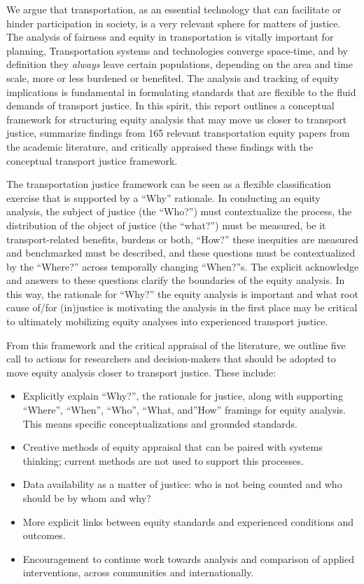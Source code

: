 \documentclass[12pt, oneside]{report}
\providecommand{\tightlist}{%
  \setlength{\itemsep}{0pt}\setlength{\parskip}{0pt}}\usepackage{longtable,booktabs,array}
\begin{document}
We argue that transportation, as an essential technology that can
facilitate or hinder participation in society, is a very relevant sphere
for matters of justice. The analysis of fairness and equity in
transportation is vitally important for planning, Transportation systems
and technologies converge space-time, and by definition they
\emph{always} leave certain populations, depending on the area and time
scale, more or less burdened or benefited. The analysis and tracking of
equity implications is fundamental in formulating standards that are
flexible to the fluid demands of transport justice. In this spirit, this
report outlines a conceptual framework for structuring equity analysis
that may move us closer to transport justice, summarize findings from
165 relevant transportation equity papers from the academic literature,
and critically appraised these findings with the conceptual transport
justice framework.

The transportation justice framework can be seen as a flexible
classification exercise that is supported by a ``Why'' rationale. In
conducting an equity analysis, the subject of justice (the ``Who?'')
must contextualize the process, the distribution of the object of
justice (the ``what?'') must be measured, be it transport-related
benefits, burdens or both, ``How?'' these inequities are measured and
benchmarked must be described, and these questions must be
contextualized by the ``Where?'' across temporally changing ``When?''s.
The explicit acknowledge and answers to these questions clarify the
boundaries of the equity analysis. In this way, the rationale for
``Why?'' the equity analysis is important and what root cause of/for
(in)justice is motivating the analysis in the first place may be
critical to ultimately mobilizing equity analyses into experienced
transport justice.

From this framework and the critical appraisal of the literature, we
outline five call to actions for researchers and decision-makers that
should be adopted to move equity analysis closer to transport justice.
These include:

\begin{itemize}
\tightlist
\item
  Explicitly explain ``Why?'', the rationale for justice, along with
  supporting ``Where'', ``When'', ``Who'', ``What, and''How'' framings
  for equity analysis. This means specific conceptualizations and
  grounded standards.
\item
  Creative methods of equity appraisal that can be paired with systems
  thinking; current methods are not used to support this processes.
\item
  Data availability as a matter of justice: who is not being counted and
  who should be by whom and why?
\item
  More explicit links between equity standards and experienced
  conditions and outcomes.
\item
  Encouragement to continue work towards analysis and comparison of
  applied interventions, across communities and internationally.
\end{itemize}
\end{document}
